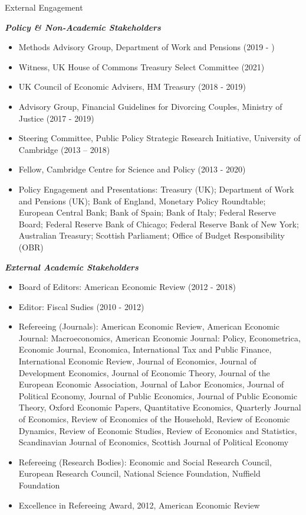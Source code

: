 \documentclass{resume} %
\begin{document}
\begin{rSection}{External Engagement}



\item \textit{\textbf{Policy \& Non-Academic Stakeholders}}
\begin{itemize} 
\item Methods Advisory Group, Department of Work and Pensions (2019 - )
\item Witness, UK House of Commons Treasury Select Committee (2021)
\item UK Council of Economic Advisers, HM Treasury (2018 - 2019)
\item Advisory Group, Financial Guidelines for Divorcing Couples, Ministry of Justice (2017 - 2019)
\item Steering Committee, Public Policy Strategic Research Initiative, University of Cambridge (2013 – 2018)
\item Fellow, Cambridge Centre for Science and Policy (2013 - 2020)
\item Policy Engagement and Presentations: Treasury (UK); Department of Work and Pensions (UK); Bank of England, Monetary Policy Roundtable; European Central Bank; Bank of Spain; Bank of Italy; Federal Reserve Board; Federal Reserve Bank of Chicago; Federal Reserve Bank of New York; Australian Treasury; Scottish Parliament; Office of Budget Responsibility (OBR)  
\end{itemize}
\vspace{0.5cm}
\item \textit{\textbf{External Academic Stakeholders}}
\begin{itemize} 
\item Board of Editors: American Economic Review (2012 - 2018)
\item Editor: Fiscal Sudies (2010 - 2012)
\item Refereeing (Journals): American Economic Review, American Economic Journal: Macroeconomics, American Economic Journal: Policy, Econometrica, Economic Journal, Economica, International Tax and Public Finance, International Economic Review, Journal of Economics, Journal of Development Economics, Journal of Economic Theory, Journal of the European Economic Association, Journal of Labor Economics, Journal of Political Economy, Journal of Public Economics, Journal of Public Economic Theory, Oxford Economic Papers, Quantitative Economics, Quarterly Journal of Economics, Review of Economics of the Household, Review of Economic Dynamics, Review of Economic Studies, Review of Economics and Statistics, Scandinavian Journal of Economics, Scottish Journal of Political Economy
\item Refereeing (Research Bodies): Economic and Social Research Council, European Research Council, National Science Foundation, Nuffield Foundation
\item Excellence in Refereeing Award, 2012, American Economic Review
\end{itemize}
    
\end{rSection}
\end{document}
